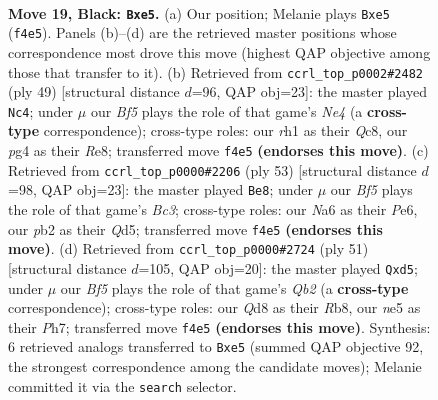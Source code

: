 \documentclass[11pt]{article}
\begin{document}
\clearpage

\begin{figure}[p]\centering
\begin{subfigure}{0.46\textwidth}\centering
\resizebox{\linewidth}{!}{%
\newchessgame
\chessboard[
  setfen={r2q3r/3p1k1p/n2P4/2p1N3/P4bP1/2N5/1P6/R2QK2R b KQ - 0 19},
  showmover=false,
  pgfstyle=straightmove, color=movearrow, markmove={f4-e5}
]}
\caption{}
\end{subfigure}\hfill
\begin{subfigure}{0.46\textwidth}\centering
\resizebox{\linewidth}{!}{%
\newchessgame
\chessboard[
  setfen={2q1rr1k/6pp/p2p4/1p1Rn1P1/7P/P3N1R1/1PP5/2KQ4 b - - 4 25},
  showmover=false,
  pgfstyle=straightmove, color=movearrow, markmove={e5-c4}
]}
\caption{}
\end{subfigure}
\\[4pt]
\begin{subfigure}{0.46\textwidth}\centering
\resizebox{\linewidth}{!}{%
\newchessgame
\chessboard[
  setfen={2r2r2/7k/ppb1p1pp/3qP3/1R6/2P3QN/5PP1/5RK1 b - - 3 27},
  showmover=false,
  pgfstyle=straightmove, color=movearrow, markmove={c6-e8}
]}
\caption{}
\end{subfigure}\hfill
\begin{subfigure}{0.46\textwidth}\centering
\resizebox{\linewidth}{!}{%
\newchessgame
\chessboard[
  setfen={1r3r1k/1q4pp/3p4/1B1Np1b1/R7/5P2/1P2Q1PP/5R1K b - - 0 26},
  showmover=false,
  pgfstyle=straightmove, color=movearrow, markmove={b7-d5}
]}
\caption{}
\end{subfigure}
\caption{\textbf{Move 19, Black: \texttt{Bxe5}.} (a) Our position; Melanie plays \texttt{Bxe5} (\texttt{f4e5}). Panels (b)--(d) are the retrieved master positions whose correspondence most drove this move (highest QAP objective among those that transfer to it). (b) Retrieved from \texttt{ccrl\_top\_p0002\#2482} (ply 49) [structural distance $d$=96, QAP obj=23]: the master played \texttt{Nc4}; under $\mu$ our \emph{Bf5} plays the role of that game's \emph{Ne4} (a \textbf{cross-type} correspondence); cross-type roles: our \emph{r}h1 as their \emph{Q}c8, our \emph{p}g4 as their \emph{R}e8; transferred move \texttt{f4e5} \textbf{(endorses this move)}. (c) Retrieved from \texttt{ccrl\_top\_p0000\#2206} (ply 53) [structural distance $d$=98, QAP obj=23]: the master played \texttt{Be8}; under $\mu$ our \emph{Bf5} plays the role of that game's \emph{Bc3}; cross-type roles: our \emph{N}a6 as their \emph{P}e6, our \emph{p}b2 as their \emph{Q}d5; transferred move \texttt{f4e5} \textbf{(endorses this move)}. (d) Retrieved from \texttt{ccrl\_top\_p0000\#2724} (ply 51) [structural distance $d$=105, QAP obj=20]: the master played \texttt{Qxd5}; under $\mu$ our \emph{Bf5} plays the role of that game's \emph{Qb2} (a \textbf{cross-type} correspondence); cross-type roles: our \emph{Q}d8 as their \emph{R}b8, our \emph{n}e5 as their \emph{P}h7; transferred move \texttt{f4e5} \textbf{(endorses this move)}. Synthesis: 6 retrieved analogs transferred to \texttt{Bxe5} (summed QAP objective 92, the strongest correspondence among the candidate moves); Melanie committed it via the \texttt{search} selector.}
\label{fig:thought-m37}
\end{figure}
\end{document}
